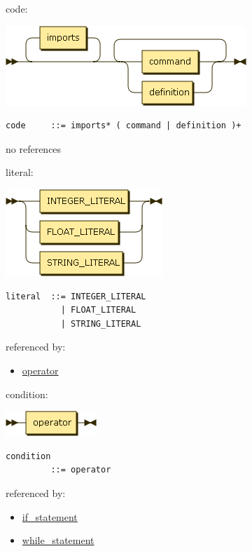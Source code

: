 \begin{minipage}{\textwidth}
\protect\hypertarget{code}{}{code:}

\includegraphics[width=3.58333in,height=1.18750in]{diagram/code.png}

\begin{verbatim}
code     ::= imports* ( command | definition )+
\end{verbatim}

no references

\end{minipage}

\begin{minipage}{\textwidth}
\protect\hypertarget{literal}{}{literal:}

\includegraphics[width=2.33333in,height=1.29167in]{diagram/literal.png}

\begin{verbatim}
literal  ::= INTEGER_LITERAL
           | FLOAT_LITERAL
           | STRING_LITERAL
\end{verbatim}

referenced by:

\begin{itemize}
\tightlist
\item
  \protect\hyperlink{operator}{operator}
\end{itemize}

\end{minipage}

\begin{minipage}{\textwidth}
\protect\hypertarget{condition}{}{condition:}

\includegraphics[width=1.35417in,height=0.37500in]{diagram/condition.png}

\begin{verbatim}
condition
         ::= operator
\end{verbatim}

referenced by:

\begin{itemize}
\tightlist
\item
  \protect\hyperlink{if_statement}{if\_statement}
\item
  \protect\hyperlink{while_statement}{while\_statement}
\end{itemize}

\end{minipage}

